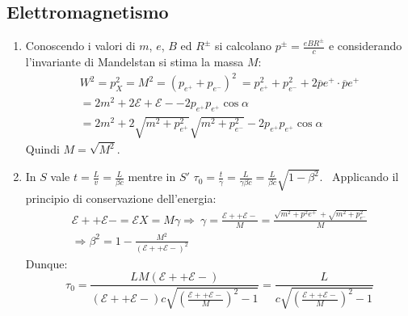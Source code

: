 \documentclass[12pt,twoside,a4]{article}
\begin{document}
\subsection{Elettromagnetismo}
\begin{solution}
\vspace{-1cm}
\begin{enumerate}[label=(\textit{\roman*})]
\item Conoscendo i valori di $m$, $e$, $B$ ed $R^{\pm}$ si calcolano $p^{\pm} = \frac{e B R^{\pm}}{c}$ e considerando l'invariante di Mandelstan si stima la massa $M$:
\begin{gather*}
W^2 = p^2_X = M^2 = (p_{e^+} + p_{e^-})^2 \
= p^2_{e^+} + p^2_{e^-} + 2 \overline{p}{e^+} \cdot \overline{p}{e^+} \\
= 2 m^2 + 2 \mathcal{E}+ \mathcal{E}- - 2 p_{e^+} p_{e^+} \cos \alpha \\
= 2 m^2 + 2 \sqrt{m^2 + p^2_{e^+}} \sqrt{m^2 + p^2_{e^-}} - 2 p_{e^+} p_{e^+} \cos \alpha
\end{gather*}
Quindi $M = \sqrt{M^2}$.
\item In $S$ vale $t = \frac{L}{v} = \frac{L}{\beta c}$ mentre in $S'$ $\tau_0 = \frac{t}{\gamma} = \frac{L}{\gamma \beta c} = \frac{L}{\beta c} \sqrt{1-\beta^2}$. \
Applicando il principio di conservazione dell'energia:
\begin{gather*}
\mathcal{E}+ + \mathcal{E}- = \mathcal{E}X = M \gamma  \Rightarrow  \  \gamma = \frac{\mathcal{E}+ + \mathcal{E}-}{M} = \frac{\sqrt{m^2 + p^2{e^+}} + \sqrt{m^2 + p^2_{e^-}}}{M} \\ \Rightarrow  \beta^2 = 1 - \frac{M^2}{(\mathcal{E}+ + \mathcal{E}-)^2}
\end{gather*}
Dunque:
\begin{equation*}
\tau_0 = \frac{L M (\mathcal{E}+ + \mathcal{E}-)}{(\mathcal{E}+ + \mathcal{E}-) c \sqrt{(\frac{\mathcal{E}+ + \mathcal{E}-}{M})^2 - 1}} = \frac{L}{c \sqrt{(\frac{\mathcal{E}+ + \mathcal{E}-}{M})^2 - 1}}
\end{equation*}
\end{enumerate}
\end{solution}
\end{document}
